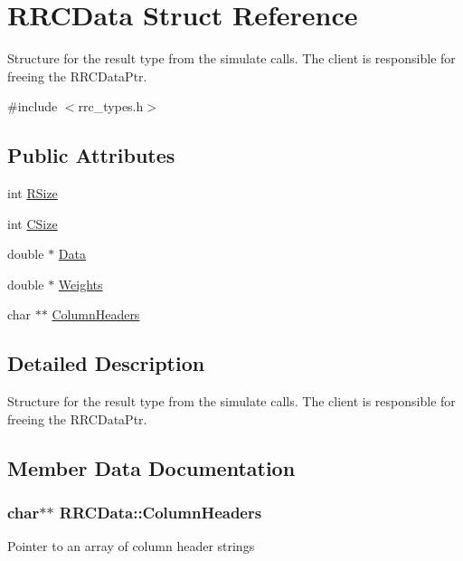 \hypertarget{struct_r_r_c_data}{}\section{R\+R\+C\+Data Struct Reference}
\label{struct_r_r_c_data}


Structure for the result type from the simulate calls. The client is responsible for freeing the R\+R\+C\+Data\+Ptr.  




{\ttfamily \#include $<$rrc\+\_\+types.\+h$>$}

\subsection*{Public Attributes}
\begin{DoxyCompactItemize}
\item 
int \hyperlink{struct_r_r_c_data_aaebd12e68638f3572eea166c7dd0af69}{R\+Size}
\item 
int \hyperlink{struct_r_r_c_data_a573616e93e0241d11b40ea56c708041b}{C\+Size}
\item 
double $\ast$ \hyperlink{struct_r_r_c_data_a4f2db98f036a01dca7168fee658bac0c}{Data}
\item 
double $\ast$ \hyperlink{struct_r_r_c_data_a2579ee2008f91694842f2278630852bf}{Weights}
\item 
char $\ast$$\ast$ \hyperlink{struct_r_r_c_data_a54acd2748775883500033984275be173}{Column\+Headers}
\end{DoxyCompactItemize}


\subsection{Detailed Description}
Structure for the result type from the simulate calls. The client is responsible for freeing the R\+R\+C\+Data\+Ptr. 

\subsection{Member Data Documentation}
\hypertarget{struct_r_r_c_data_a54acd2748775883500033984275be173}{}
\subsubsection[{Column\+Headers}]{\setlength{\rightskip}{0pt plus 5cm}char$\ast$$\ast$ R\+R\+C\+Data\+::\+Column\+Headers}\label{struct_r_r_c_data_a54acd2748775883500033984275be173}
Pointer to an array of column header strings \hypertarget{struct_r_r_c_data_a573616e93e0241d11b40ea56c708041b}{}
